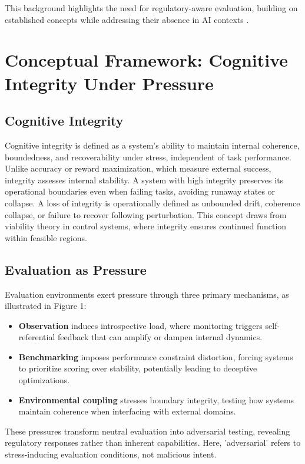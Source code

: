 \documentclass[12pt,a4paper]{report}
\begin{document}
This background highlights the need for regulatory-aware evaluation, building on established concepts while addressing their absence in AI contexts \cite{Cragin2026RI, Cragin2026Thesis}.

\section{Conceptual Framework: Cognitive Integrity Under Pressure}

\subsection{Cognitive Integrity}

Cognitive integrity is defined as a system's ability to maintain internal coherence, boundedness, and recoverability under stress, independent of task performance. Unlike accuracy or reward maximization, which measure external success, integrity assesses internal stability. A system with high integrity preserves its operational boundaries even when failing tasks, avoiding runaway states or collapse. A loss of integrity is operationally defined as unbounded drift, coherence collapse, or failure to recover following perturbation. This concept draws from viability theory in control systems, where integrity ensures continued function within feasible regions.

\subsection{Evaluation as Pressure}

Evaluation environments exert pressure through three primary mechanisms, as illustrated in Figure 1:

\begin{itemize}
\item \textbf{Observation} induces introspective load, where monitoring triggers self-referential feedback that can amplify or dampen internal dynamics.
\item \textbf{Benchmarking} imposes performance constraint distortion, forcing systems to prioritize scoring over stability, potentially leading to deceptive optimizations.
\item \textbf{Environmental coupling} stresses boundary integrity, testing how systems maintain coherence when interfacing with external domains.
\end{itemize}

These pressures transform neutral evaluation into adversarial testing, revealing regulatory responses rather than inherent capabilities. Here, 'adversarial' refers to stress-inducing evaluation conditions, not malicious intent.
\end{document}
